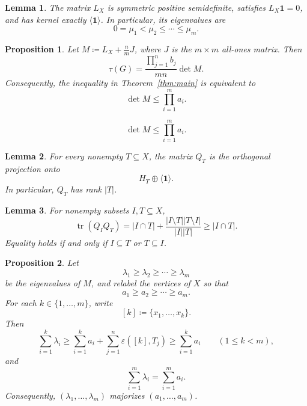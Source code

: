 \documentclass[10pt,a4paper]{amsart}
\newtheorem{proposition}{Proposition}
\newtheorem{lemma}{Lemma}
\newcommand{\epsov}{\varepsilon}
\begin{document}
\begin{lemma}\label{lem:kernel}
The matrix $L_X$ is symmetric positive semidefinite, satisfies 
$L_X\mathbf1=0$, and has kernel exactly $\langle \mathbf1\rangle$. 
In particular, its eigenvalues are
\[
0=\mu_1<\mu_2\le \cdots \le \mu_m.
\]
\end{lemma}

\begin{proposition}\label{prop:reduction}
Let $M\coloneqq L_X+\frac{n}{m}J$, where $J$ is the $m\times m$ all-ones matrix. Then
\begin{equation}\label{eq:tau-detM}
\tau(G)=\frac{\prod_{j=1}^n b_j}{mn}\det M.
\end{equation}
Consequently, the inequality in Theorem~\ref{thm:main} is equivalent to
\begin{equation}\label{eq:det-bound}
\det M\le \prod_{i=1}^m a_i.
\end{equation}
\end{proposition}

\begin{equation}
\det M\le \prod_{i=1}^m a_i.
\end{equation}

\begin{lemma}\label{lem:Q-proj}
For every nonempty $T\subseteq X$, the matrix $Q_T$ is the 
orthogonal projection onto
\[
H_T\oplus \langle \mathbf1\rangle.
\]
In particular, $Q_T$ has rank $|T|$.
\end{lemma}

\begin{lemma}\label{lem:overlap}
For nonempty subsets $I,T\subseteq X$,
\begin{equation}\label{eq:overlap}
\operatorname{tr}(Q_IQ_T)
=
|I\cap T|+\frac{|I\setminus T||T\setminus I|}{|I||T|}
\ge |I\cap T|.
\end{equation}
Equality holds if and only if $I\subseteq T$ or $T\subseteq I$.
\end{lemma}

\begin{proposition}\label{prop:majorization}
Let
\[
\lambda_1\ge \lambda_2\ge \cdots \ge \lambda_m
\]
be the eigenvalues of $M$, and relabel the vertices of $X$ so that
\[
a_1\ge a_2\ge \cdots \ge a_m.
\]
For each $k\in\{1,\dots,m\}$, write
\[
[k]\coloneqq \{x_1,\dots,x_k\}.
\]
Then
\begin{equation}\label{eq:partial-sum-ineq}
\sum_{i=1}^k \lambda_i
\ge
\sum_{i=1}^k a_i+\sum_{j=1}^n \epsov([k],T_j)
\ge
\sum_{i=1}^k a_i
\qquad (1\le k<m),
\end{equation}
and
\[
\sum_{i=1}^m \lambda_i=\sum_{i=1}^m a_i.
\]
Consequently, $(\lambda_1,\dots,\lambda_m)$ majorizes $(a_1,\dots,a_m)$.
\end{proposition}
\end{document}
